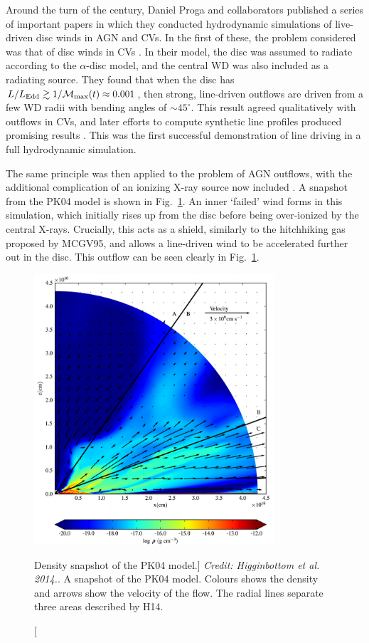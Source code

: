 Around the turn of the century, Daniel Proga and collaborators 
published a series of important papers in which they conducted 
hydrodynamic simulations of live-driven disc winds in AGN and CVs. 
In the first of these, the problem considered was that of disc
winds in CVs \citep{proga1998}. In their model, the disc was assumed
to radiate according to the $\alpha$-disc model, and the central WD was also included
as a radiating source. They found that when the disc has 
$L / L_{\mathrm{Edd}} \gtrsim 1 / {\cal M}_{\mathrm{max}} (t) \approx 0.001$, 
then strong, line-driven
outflows are driven from a few WD radii with bending angles of $\sim45^\circ$.
This result agreed qualitatively with outflows in CVs, and later efforts to compute
synthetic line profiles produced promising results \citep{proga2002}. This was the
first successful demonstration of line driving in a full hydrodynamic simulation.

The same principle was then applied to the problem of AGN outflows, with the
additional complication of an ionizing X-ray source now included 
\citep[][hereafter PK04]{PSK2000,PK04}. A snapshot from the PK04 model
is shown in Fig.~\ref{fig:PK04}. An inner `failed' wind forms in this simulation,
which initially rises up from the disc before being over-ionized by the central X-rays.
Crucially, this acts as a shield, similarly to the hitchhiking gas proposed by
MCGV95, and allows a line-driven wind to be accelerated further out in the disc. 
This outflow can be seen clearly in Fig.~\ref{fig:PK04}.

\begin{figure}
\centering
\includegraphics[width=0.8\textwidth]{figures/02-outflows/pk04_h14.png}
\caption
[Density snapshot of the PK04 model.]
{
{\sl Credit: Higginbottom et al. 2014.}. 
A snapshot of the PK04 model. Colours shows the density and 
arrows show the velocity of the flow. 
The radial lines separate three areas described by H14.
} 
\label{fig:PK04}
\end{figure}

